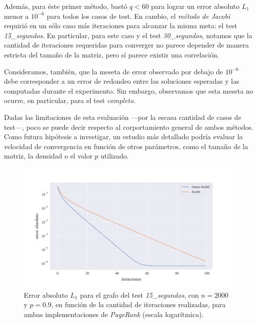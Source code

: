 \vspace{1em}
Además, para éste primer método, bastó $q < 60$ para lograr un error absoluto $L_1$ menor a $10^{-6}$ para todos los casos de test. En cambio, el \textit{método de Jacobi} requirió  en un sólo caso más iteraciones para alcanzar la misma meta: el test \textit{15\_segundos}. En particular, para este caso y el test \textit{30\_segundos}, notamos que la cantidad de iteraciones requeridas para converger no parece depender de manera estricta del tamaño de la matriz, pero sí parece existir una correlación.

\vspace{1em}
Consideramos, también, que la meseta de error observado por debajo de $10^{-6}$ debe corresponder a un error de redondeo entre las soluciones esperadas y las computadas durante el experimento. Sin embargo, observamos que esta meseta no ocurre, en particular, para el test \textit{completo}.

\vspace{1em}
Dadas las limitaciones de esta evaluación ---por la escasa cantidad de casos de test---, poco se puede decir respecto al corportamiento general de ambos métodos. Como futura hipótesis a investigar, un estudio más detallado podría evaluar la velocidad de convergencia en función de otros parámetros, como el tamaño de la matriz, la densidad o el valor $p$ utilizado. 

\begin{figure}[!htbp]
    \centering
    \includegraphics[width=1\textwidth, trim=0 0 0 30]{files/src/.media/convergencia_test_15_segundos.png}
    \caption{Error absoluto $L_1$ para el grafo del test \textit{15\_segundos}, con $n = 2000$ y $p = 0.9$, en función de la cantidad de iteraciones realizadas, para ambas implementaciones de \textit{PageRank} (escala logarítmica).} \label{test_15_segundos}
\end{figure}

